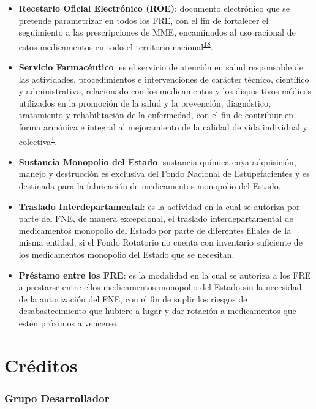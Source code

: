 \documentclass[
  oneside]{book}
\begin{document}
\begin{itemize}
\item
  \textbf{Recetario Oficial Electrónico (ROE)}: documento electrónico que se pretende parametrizar en todos los FRE, con el fin de fortalecer el seguimiento a las prescripciones de MME, encaminados al uso racional de estos medicamentos en todo el territorio nacional\textsuperscript{\protect\hyperlink{ref-CuervoBustamante2021}{18}}.
\item
  \textbf{Servicio Farmacéutico}: es el servicio de atención en salud responsable de las actividades, procedimientos e intervenciones de carácter técnico, científico y administrativo, relacionado con los medicamentos y los dispositivos médicos utilizados en la promoción de la salud y la prevención, diagnóstico, tratamiento y rehabilitación de la enfermedad, con el fin de contribuir en forma armónica e integral al mejoramiento de la calidad de vida individual y colectiva\textsuperscript{\protect\hyperlink{ref-MSPS1478-2006}{1}}.
\item
  \textbf{Sustancia Monopolio del Estado}: sustancia química cuya adquisición, manejo y destrucción es exclusiva del Fondo Nacional de Estupefacientes y es destinada para la fabricación de medicamentos monopolio del Estado.
\item
  \textbf{Traslado Interdepartamental}: es la actividad en la cual se autoriza por parte del FNE, de manera excepcional, el traslado interdepartamental de medicamentos monopolio del Estado por parte de diferentes filiales de la misma entidad, si el Fondo Rotatorio no cuenta con inventario suficiente de los medicamentos monopolio del Estado que se necesitan.
\item
  \textbf{Préstamo entre los FRE}: es la modalidad en la cual se autoriza a los FRE a prestarse entre ellos medicamentos monopolio del Estado sin la necesidad de la autorización del FNE, con el fin de suplir los riesgos de desabastecimiento que hubiere a lugar y dar rotación a medicamentos que estén próximos a vencerse.
\end{itemize}

\hypertarget{cruxe9ditos}{%
\chapter*{Créditos}\label{cruxe9ditos}}

\hypertarget{grupo-desarrollador}{%
\subsection*{Grupo Desarrollador}\label{grupo-desarrollador}}
\end{document}
